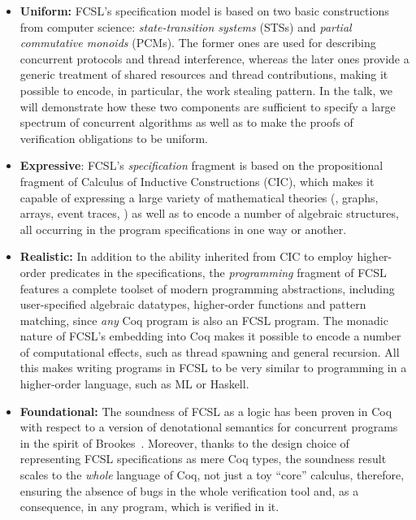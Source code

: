 \documentclass[blockstyle,preprint,nocopyrightspace]{sigplanconf}
\begin{document}
\begin{itemize}[leftmargin=*]

\item \textbf{Uniform:} FCSL's specification model is based on two
  basic constructions from computer science: \emph{state-transition
    systems} (STSs) and \emph{partial commutative monoids} (PCMs). The
  former ones are used for describing concurrent protocols and thread
  interference, whereas the later ones provide a generic treatment of
  shared resources and thread contributions, making it possible to
  encode, in particular, the work stealing pattern. In the talk, we
  will demonstrate how these two components are sufficient to specify
  a large spectrum of concurrent algorithms as well as to make the
  proofs of verification obligations to be uniform.

\item \textbf{Expressive}: FCSL's \emph{specification} fragment is
  based on the propositional fragment of Calculus of Inductive
  Constructions (CIC), which makes it capable of expressing a large
  variety of mathematical theories (\eg, graphs, arrays, event traces,
  \etc) as well as to encode a number of algebraic structures, all
  occurring in the program specifications in one way or another.

\item \textbf{Realistic:} In addition to the ability inherited from
  CIC to employ higher-order predicates in the specifications, the
  \emph{programming} fragment of FCSL features a complete toolset of
  modern programming abstractions, including user-specified algebraic
  datatypes, higher-order functions and pattern matching, since
  \emph{any} Coq program is also an FCSL program.
  The monadic nature of FCSL's embedding into Coq makes it possible to
  encode a number of computational effects, such as thread spawning
  and general recursion. All this makes writing programs in FCSL to be
  very similar to programming in a higher-order language, such as ML
  or Haskell.

\item \textbf{Foundational:} The soundness of FCSL as a logic has been
  proven in Coq with respect to a version of denotational semantics
  for concurrent programs in the spirit of
  Brookes~\cite{Brookes:TCS07}. Moreover, thanks to the design choice
  of representing FCSL specifications as mere Coq types, the soundness
  result scales to the \emph{whole} language of Coq, not just a toy
  ``core'' calculus, therefore, ensuring the absence of bugs in the
  whole verification tool and, as a consequence, in any program, which
  is verified in it.

\end{itemize}
\end{document}
